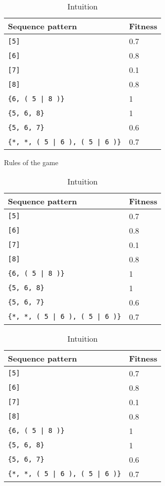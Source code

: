 \begin{table}
\centering
\begin{subtable}{0.5\linewidth}
\begin{tabular}[ht]{ll}\hline
	Sequence pattern & Fitness \\\hline
	\verb![5]! & 0.7 \\
	\verb![6]! & 0.8 \\
	\verb![7]! & 0.1 \\
	\verb![8]! & 0.8 \\
	\verb!{6, ( 5 | 8 )}! & 1 \\
	\verb!{5, 6, 8}! & 1 \\
	\verb!{5, 6, 7}! & 0.6 \\
	\verb!{*, *, ( 5 | 6 ), ( 5 | 6 )}! & 0.7\\
\end{tabular}
\caption{Rules of the game}
\label{tab:apx_fitness_handcrafted_rules}
\end{subtable}
\begin{subtable}{0.45\linewidth}
\begin{tabular}[ht]{ll}\hline
	Sequence pattern & Fitness \\\hline
	\verb![5]! & 0.7 \\
	\verb![6]! & 0.8 \\
	\verb![7]! & 0.1 \\
	\verb![8]! & 0.8 \\
	\verb!{6, ( 5 | 8 )}! & 1 \\
	\verb!{5, 6, 8}! & 1 \\
	\verb!{5, 6, 7}! & 0.6 \\
	\verb!{*, *, ( 5 | 6 ), ( 5 | 6 )}! & 0.7\\
\end{tabular}
\caption{Intuition}
\label{tab:apx_fitness_handcrafted_intuition}
\end{subtable}
\begin{subtable}{0.5\linewidth}
\begin{tabular}[ht]{ll}\hline
	Sequence pattern & Fitness \\\hline
	\verb![5]! & 0.7 \\
	\verb![6]! & 0.8 \\
	\verb![7]! & 0.1 \\
	\verb![8]! & 0.8 \\
	\verb!{6, ( 5 | 8 )}! & 1 \\
	\verb!{5, 6, 8}! & 1 \\
	\verb!{5, 6, 7}! & 0.6 \\
	\verb!{*, *, ( 5 | 6 ), ( 5 | 6 )}! & 0.7\\

\end{tabular}
\end{subtable}
\end{table}
